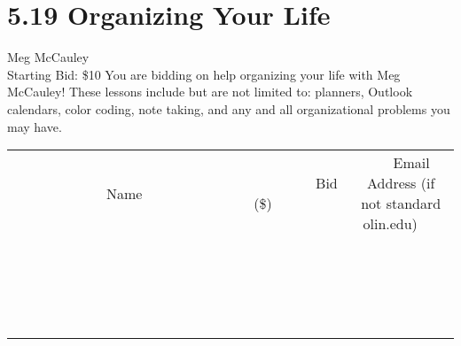 \documentclass[11pt]{article}
\begin{document}
\section*{5.19 Organizing Your Life}
Meg McCauley
\\
Starting Bid: \$10
\newline
You are bidding on help organizing your life with Meg McCauley! These lessons include but are not limited to: planners, Outlook calendars, color coding, note taking, and any and all organizational problems you may have.
\\[3ex]
\begin{tabular}{c c c}
~~~~~~~~~~~~~Name~~~~~~~~~~~~~ & ~~~~~~~~~Bid (\$)~~~~~~~~~  & ~~~Email Address (if not standard olin.edu)~~~\\
 & & \\
\hline
 & & \\
\hline
 & & \\
\hline
 & & \\
\hline
 & & \\
\hline
 & & \\
\hline
 & & \\
\hline
 & & \\
\hline
 & & \\
\hline
 & & \\
\hline
 & & \\
\hline
 & & \\
\hline
 & & \\
\hline
 & & \\
\hline
 & & \\
\hline
 & & \\
\hline
 & & \\
\hline
 & & \\
\hline
 & & \\
\hline
\end{tabular}
\newpage
\end{document}

